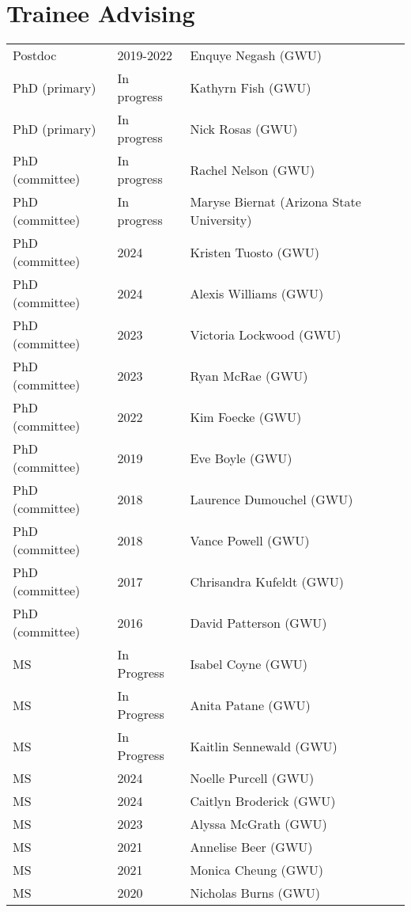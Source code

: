 \documentclass{article}
\begin{document}
\section*{Trainee Advising}
\begin{tabular}{p{}p{}p{}}
Postdoc & 2019-2022 & Enquye Negash (GWU)\\[4pt]
PhD (primary) & In progress & Kathyrn Fish (GWU)\\[4pt] %
PhD (primary) & In progress & Nick Rosas (GWU)\\[4pt] %
PhD (committee) & In progress & Rachel Nelson (GWU)\\[4pt]
PhD (committee) & In progress & Maryse Biernat (Arizona State University)\\[4pt]
PhD (committee) & 2024 & Kristen Tuosto (GWU)\\[4pt]
PhD (committee) & 2024 & Alexis Williams (GWU)\\[4pt]
PhD (committee) & 2023 & Victoria Lockwood (GWU)\\[4pt]
PhD (committee) & 2023 & Ryan McRae (GWU)\\[4pt]
PhD (committee) & 2022 & Kim Foecke (GWU)\\[4pt]
PhD (committee) & 2019 & Eve Boyle (GWU)\\[4pt]
PhD (committee) & 2018 & Laurence Dumouchel (GWU)\\[4pt]
PhD (committee) & 2018 & Vance Powell (GWU)\\[4pt]
PhD (committee) & 2017 & Chrisandra Kufeldt (GWU)\\[4pt]
PhD (committee) & 2016 & David Patterson (GWU)\\

MS & In Progress & Isabel Coyne (GWU)\\[4pt]%
MS & In Progress & Anita Patane (GWU)\\[4pt]%
MS & In Progress & Kaitlin Sennewald (GWU)\\[4pt]%
MS & 2024 & Noelle Purcell (GWU)\\[4pt]%
MS & 2024 & Caitlyn Broderick (GWU)\\[4pt]%
MS & 2023 & Alyssa McGrath (GWU)\\[4pt]%
MS & 2021 & Annelise Beer (GWU)\\[4pt]
MS & 2021 & Monica Cheung (GWU)\\[4pt]
MS & 2020 & Nicholas Burns (GWU)\\[4pt] %
\end{tabular}
\end{document}
